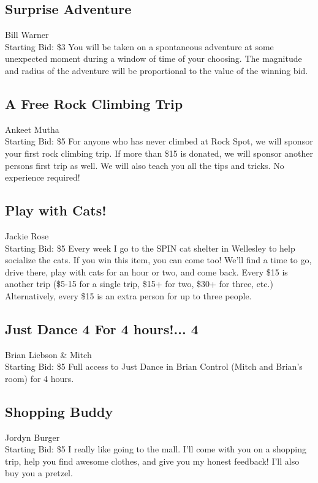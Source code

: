 \documentclass[11pt]{article}
\begin{document}
\subsection{Surprise Adventure}
Bill Warner
\\
Starting Bid: \$3
\newline
You will be taken on a spontaneous adventure at some unexpected moment during a window of time of your choosing. The magnitude and radius of the adventure will be proportional to the value of the winning bid.
\subsection{A Free Rock Climbing Trip}
Ankeet Mutha
\\
Starting Bid: \$5
\newline
For anyone who has never climbed at Rock Spot, we will sponsor your first rock climbing trip. If more than \$15 is donated, we will sponsor another persons first trip as well. We will also teach you all the tips and tricks. No experience required!
\subsection{Play with Cats!}
Jackie Rose
\\
Starting Bid: \$5
\newline
Every week I go to the SPIN cat shelter in Wellesley to help socialize the cats. If you win this item, you can come too! We'll find a time to go, drive there, play with cats for an hour or two, and come back. Every \$15 is another trip (\$5-15 for a single trip, \$15+ for two, \$30+ for three, etc.) Alternatively, every \$15 is an extra person for up to three people.
\subsection{Just Dance 4 For 4 hours!... 4}
Brian Liebson \& Mitch
\\
Starting Bid: \$5
\newline
Full access to Just Dance in Brian Control (Mitch and Brian's room) for 4 hours.
\subsection{Shopping Buddy}
Jordyn Burger
\\
Starting Bid: \$5
\newline
I really like going to the mall. I'll come with you on a shopping trip, help you find awesome clothes, and give you my honest feedback! I'll also buy you a pretzel.
\end{document}
